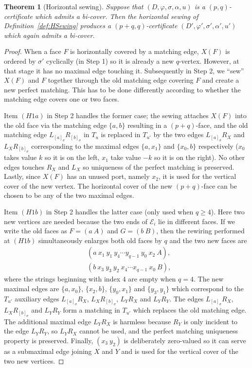 \documentclass[11pt]{article}
\newtheorem{theorem}{Theorem}[section]
\theoremstyle{remark}
\newcommand{\orb}[1]{[#1]_{\sigma}}
\newcommand{\cE}{\mathcal E}
\begin{document}
\begin{theorem}[Horizontal sewing]\label{thm:H}
Suppose that $(D,\varphi,\sigma,\alpha,u)$ is a $(p,q)$-certificate which
admits a bi-cover. Then the
horizontal sewing of Definition~\ref{def:HSewing} produces a
$(p+q,q)$-certificate $(D',\varphi',\sigma',\alpha',u')$
which again admits a bi-cover.  %
\end{theorem}

\begin{proof} %

When a face $F$ is horizontally covered by a matching edge, $X(F)$ is ordered by $\sigma'$ cyclically (in Step 1) so it is already a new $q$-vertex. However, at that stage it has no maximal edge touching it. Subsequently in Step 2, we ``sew'' $X(F)$ and $F$ together through the old matching edge covering $F$ and create a new perfect matching. This has to be done differently according to whether the matching edge covers one or two faces. 

Item $(H1a)$ in Step 2 handles the former case; the sewing attaches $X(F)$ into the old face via the matching edge $\{a,b\}$ resulting in a $(p+q)$-face, and the old matching edge $L_{\orb a} R_{\orb b}$ in $T_u$ is replaced in $T_{u'}$ by the two edges $L_{\orb a} R_X$ and  $L_X R_{\orb b}$ corresponding to the maximal edges $\{a, x_1\}$ and $\{x_0, b\}$ respectively ($x_0$ takes value $k$ so it is on the left, $x_1$ take value $-k$ so it is on the right). No other edges touches $R_X$ and $L_X$ so uniqueness of the perfect matching is preserved. Lastly, since $X(F)$ has an unused port, namely $x_2$, it is used for the vertical cover of the new vertex. The horizontal cover of the new $(p+q)$-face can be chosen to be any of the two maximal edges. 

Item $(H1b)$ in Step 2 handles the latter case (only used when $q\geq 4$). Here two new vertices are needed because the two ends of $\cE_i$ lie in different faces. If we write the old faces as $F=(a\ A)$ and $G=(b\ B)$, then the rewiring performed at $(H1b)$ simultaneously enlarges both old faces by $q$ and the 
two new faces are
\[
\begin{aligned}
 &(a\ x_1\ y_1\ y_4\cdots y_{q-1}\ y_0\ x_2\ A),\\
 &(b\ x_3\ y_3\ y_2\ x_4\cdots x_{q-1}\ x_0\ B),
\end{aligned}
\]
where the strings beginning with index $4$ are empty when $q=4$. The new maximal edges are $\{a, x_0\}$, $\{x_2,b\}$, $\{y_0,x_1\}$ and $\{y_3, y_1\}$ which correspond to the $T_{u'}$ auxiliary edges $L_{\orb a} R_X$, $L_X R_{\orb b}$, $L_Y R_X$ and $L_Y R_Y$.
The edges $L_{\orb a} R_X$, $L_X R_{\orb b}$ and $L_Y R_Y$ form a matching in $T_{u'}$ which replaces the old matching edge. The additional
maximal edge $L_Y R_X$ is harmless because $R_Y$ is only incident to the edge $L_Y R_Y$, so $L_YR_X$ cannot be used, and the perfect matching uniqueness property is preserved.  Finally, $(x_3\ y_2)$ is deliberately zero-valued so it can serve as a submaximal edge joining $X$ and $Y$ and is used for the vertical cover of the two new vertices.  


\end{proof}
\end{document}
